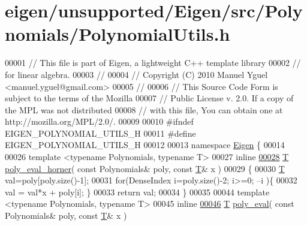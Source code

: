 \hypertarget{eigen_2unsupported_2_eigen_2src_2_polynomials_2_polynomial_utils_8h_source}{}\section{eigen/unsupported/\+Eigen/src/\+Polynomials/\+Polynomial\+Utils.h}
\label{eigen_2unsupported_2_eigen_2src_2_polynomials_2_polynomial_utils_8h_source}

\begin{DoxyCode}
00001 \textcolor{comment}{// This file is part of Eigen, a lightweight C++ template library}
00002 \textcolor{comment}{// for linear algebra.}
00003 \textcolor{comment}{//}
00004 \textcolor{comment}{// Copyright (C) 2010 Manuel Yguel <manuel.yguel@gmail.com>}
00005 \textcolor{comment}{//}
00006 \textcolor{comment}{// This Source Code Form is subject to the terms of the Mozilla}
00007 \textcolor{comment}{// Public License v. 2.0. If a copy of the MPL was not distributed}
00008 \textcolor{comment}{// with this file, You can obtain one at http://mozilla.org/MPL/2.0/.}
00009 
00010 \textcolor{preprocessor}{#ifndef EIGEN\_POLYNOMIAL\_UTILS\_H}
00011 \textcolor{preprocessor}{#define EIGEN\_POLYNOMIAL\_UTILS\_H}
00012 
00013 \textcolor{keyword}{namespace }\hyperlink{namespace_eigen}{Eigen} \{ 
00014 
00026 \textcolor{keyword}{template} <\textcolor{keyword}{typename} Polynomials, \textcolor{keyword}{typename} T>
00027 \textcolor{keyword}{inline}
\hyperlink{namespace_eigen_aadbf059bc28ce1cf94c57c1454633d40}{00028} \hyperlink{group___sparse_core___module}{T} \hyperlink{namespace_eigen_aadbf059bc28ce1cf94c57c1454633d40}{poly\_eval\_horner}( \textcolor{keyword}{const} Polynomials& poly, \textcolor{keyword}{const} \hyperlink{group___sparse_core___module}{T}& x )
00029 \{
00030   \hyperlink{group___sparse_core___module}{T} val=poly[poly.size()-1];
00031   \textcolor{keywordflow}{for}(DenseIndex i=poly.size()-2; i>=0; --i )\{
00032     val = val*x + poly[i]; \}
00033   \textcolor{keywordflow}{return} val;
00034 \}
00035 
00044 \textcolor{keyword}{template} <\textcolor{keyword}{typename} Polynomials, \textcolor{keyword}{typename} T>
00045 \textcolor{keyword}{inline}
\hyperlink{namespace_eigen_adb64ffddaa9e83634e3ab0e3fd3664f5}{00046} \hyperlink{group___sparse_core___module}{T} \hyperlink{namespace_eigen_adb64ffddaa9e83634e3ab0e3fd3664f5}{poly\_eval}( \textcolor{keyword}{const} Polynomials& poly, \textcolor{keyword}{const} \hyperlink{group___sparse_core___module}{T}& x )

\end{DoxyCode}
